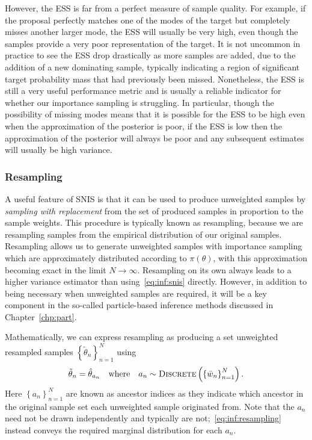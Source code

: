 However, the ESS is far from a perfect measure of sample quality.  For example, if the proposal
perfectly matches one of the modes of the target but completely misses another larger mode, the
ESS will usually be very high, even though the samples provide a very poor representation of the
target.  It is not uncommon in practice to see the ESS drop drastically as more samples are added,
due to the addition of a new dominating sample, typically indicating a region of significant target probability
mass that had previously been missed.  Nonetheless, the ESS is still a very useful performance
metric and is usually a reliable indicator for whether our importance sampling is struggling.  
In particular, though the possibility of missing modes means that it is possible for the ESS to be 
high even when the approximation of the posterior is poor, if the ESS is low then the approximation 
of the posterior will always be poor and any subsequent estimates will usually be high variance.

\subsubsection{Resampling}
\label{sec:inf:foundation:resampling}

A useful feature of SNIS is that it can be used to produce unweighted samples
by \emph{sampling with replacement} from the set of produced samples in proportion
to the sample weights.  This procedure is typically known as resampling, because we
are resampling samples from the empirical distribution of our original samples.
Resampling allows us to generate unweighted samples with importance sampling which are
approximately distributed according to $\pi(\theta)$, with this approximation becoming
exact in the limit $N\rightarrow\infty$.  
Resampling on its own always leads to a higher variance estimator than using~\eqref{eq:inf:snis}
directly.   However, in addition to  being necessary when unweighted samples are required,
it will be a key component in the so-called particle-based inference methods discussed
in Chapter~\ref{chp:part}.  

Mathematically, we can express resampling as producing a set unweighted resampled
samples $\left\{\tilde{\theta}_n\right\}_{n=1}^N$ using
\begin{align}
\label{eq:inf:resampling}
\tilde{\theta}_n = \hat{\theta}_{a_n} \quad \mathrm{where} \quad
a_n \sim \textsc{Discrete}\left(\left\{\bar{w}_n\right\}_{n=1}^N\right).
\end{align}
Here $\left\{a_n\right\}_{n=1}^N$ are known as ancestor indices as they indicate which ancestor
in the original sample set each unweighted sample originated from.  Note that the $a_n$ need
not be drawn independently and typically are not;~\eqref{eq:inf:resampling} instead conveys
the required marginal distribution for each $a_n$.  

